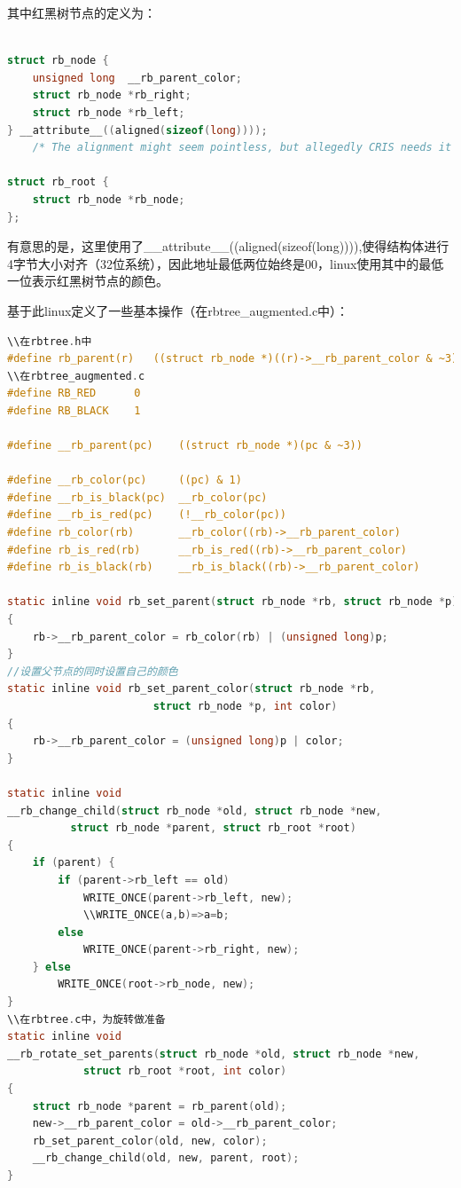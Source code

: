 其中红黑树节点的定义为：
\begin{lstlisting}[language=C]

struct rb_node {
	unsigned long  __rb_parent_color;
	struct rb_node *rb_right;
	struct rb_node *rb_left;
} __attribute__((aligned(sizeof(long))));
    /* The alignment might seem pointless, but allegedly CRIS needs it */

struct rb_root {
	struct rb_node *rb_node;
};
\end{lstlisting}

有意思的是，这里使用了\_\_attribute\_\_((aligned(sizeof(long)))),使得结构体进行4字节大小对齐（32位系统），因此地址最低两位始终是00，linux使用其中的最低一位表示红黑树节点的颜色。

基于此linux定义了一些基本操作（在rbtree\_augmented.c中）：

\begin{lstlisting}[language=C]
\\在rbtree.h中
#define rb_parent(r)   ((struct rb_node *)((r)->__rb_parent_color & ~3))
\\在rbtree_augmented.c
#define	RB_RED		0
#define	RB_BLACK	1

#define __rb_parent(pc)    ((struct rb_node *)(pc & ~3))

#define __rb_color(pc)     ((pc) & 1)
#define __rb_is_black(pc)  __rb_color(pc)
#define __rb_is_red(pc)    (!__rb_color(pc))
#define rb_color(rb)       __rb_color((rb)->__rb_parent_color)
#define rb_is_red(rb)      __rb_is_red((rb)->__rb_parent_color)
#define rb_is_black(rb)    __rb_is_black((rb)->__rb_parent_color)

static inline void rb_set_parent(struct rb_node *rb, struct rb_node *p)
{
	rb->__rb_parent_color = rb_color(rb) | (unsigned long)p;
}
//设置父节点的同时设置自己的颜色
static inline void rb_set_parent_color(struct rb_node *rb,
				       struct rb_node *p, int color)
{
	rb->__rb_parent_color = (unsigned long)p | color;
}

static inline void
__rb_change_child(struct rb_node *old, struct rb_node *new,
		  struct rb_node *parent, struct rb_root *root)
{
	if (parent) {
		if (parent->rb_left == old)
			WRITE_ONCE(parent->rb_left, new);
            \\WRITE_ONCE(a,b)=>a=b;
		else
			WRITE_ONCE(parent->rb_right, new);
	} else
		WRITE_ONCE(root->rb_node, new);
}
\\在rbtree.c中，为旋转做准备
static inline void
__rb_rotate_set_parents(struct rb_node *old, struct rb_node *new,
			struct rb_root *root, int color)
{
	struct rb_node *parent = rb_parent(old);
	new->__rb_parent_color = old->__rb_parent_color;
	rb_set_parent_color(old, new, color);
	__rb_change_child(old, new, parent, root);
}

\end{lstlisting}

